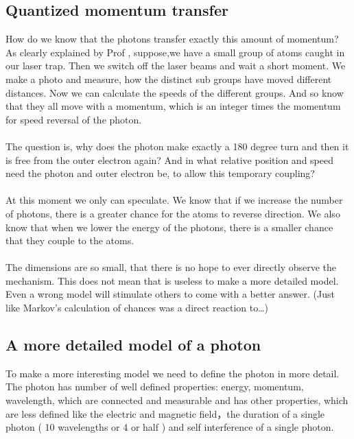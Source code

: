 \subsection{Quantized momentum transfer}
How do we know that the photons transfer exactly this amount of momentum? As clearly explained by Prof , suppose,we have a small group of atoms caught in our laser trap. Then we switch off the laser beams and wait a short moment. We make a photo and measure, how the distinct sub groups have moved different distances. Now we can calculate the speeds of the different groups. And so know that they all move with a momentum, which is an integer times the momentum for speed reversal of the photon.
\paragraph{}
The question is, why does the photon make exactly a 180 degree turn and then it is free from the outer electron again? And in what relative position and speed need the photon and outer electron be, to allow this temporary coupling?
\paragraph{}
At this moment we only can speculate. We know that if we increase the number of photons, there is a greater chance for the atoms to reverse direction. We also know that when we lower the energy of the photons, there is a smaller chance that they couple to the atoms.
\paragraph{}
The dimensions are so small, that there is no hope to ever directly observe the mechanism. This does not mean that is useless to make a more detailed model. Even a wrong model will stimulate others to come with a better answer. (Just like Markov's calculation of chances was a direct reaction to…)

\subsection{A more detailed model of a photon}
To make a more interesting model we need to define the photon in more detail. The photon has number of well defined properties: energy, momentum, wavelength, which are connected and measurable and has other properties, which are less defined like the electric and magnetic field，the duration of a single photon ( 10 wavelengths or 4 or half ) and self interference of a single photon.
